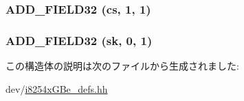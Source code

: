 \label{structiGbReg_1_1Regs_1_1EECD_a524dd5efaf07df1d10f4489aa7474d15}
\hypertarget{structiGbReg_1_1Regs_1_1EECD_afe69e407740cb74a62eacf0c713b7f6c}{
\subsubsection[{ADD\_\-FIELD32}]{\setlength{\rightskip}{0pt plus 5cm}ADD\_\-FIELD32 (cs, \/  1, \/  1)}}
\label{structiGbReg_1_1Regs_1_1EECD_afe69e407740cb74a62eacf0c713b7f6c}
\hypertarget{structiGbReg_1_1Regs_1_1EECD_a90d537a0032458373eda20d497b1e86d}{
\subsubsection[{ADD\_\-FIELD32}]{\setlength{\rightskip}{0pt plus 5cm}ADD\_\-FIELD32 (sk, \/  0, \/  1)}}
\label{structiGbReg_1_1Regs_1_1EECD_a90d537a0032458373eda20d497b1e86d}


この構造体の説明は次のファイルから生成されました:\begin{DoxyCompactItemize}
\item 
dev/\hyperlink{i8254xGBe__defs_8hh}{i8254xGBe\_\-defs.hh}\end{DoxyCompactItemize}
